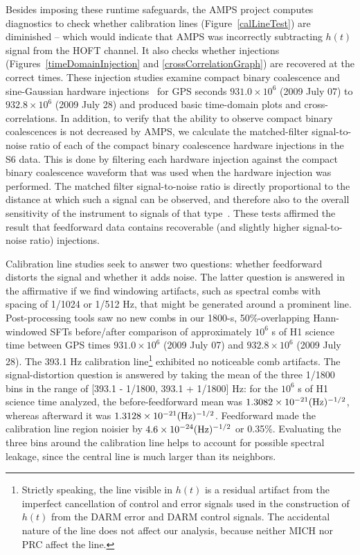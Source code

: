 Besides imposing these runtime safeguards, the AMPS project computes diagnostics to check whether calibration lines (Figure~\ref{calLineTest}) are diminished -- which would indicate that AMPS was incorrectly subtracting $h(t)$ signal from the HOFT channel. It also checks whether injections (Figures~\ref{timeDomainInjection} and \ref{crossCorrelationGraph}) are recovered at the correct times. These injection studies examine compact binary coalescence and sine-Gaussian hardware injections~\cite{LIGOBurst2012} for GPS seconds $931.0 \times 10^6$ (2009 July 07) to $932.8 \times 10^6$ (2009 July 28) and produced basic time-domain plots and cross-correlations. In addition, to verify that the ability to observe compact binary coalescences is not decreased by AMPS, we calculate the matched-filter signal-to-noise ratio of each of the compact binary coalescence hardware injections in the S6 data. This is done by filtering each hardware injection against the compact binary coalescence waveform that was used when the hardware injection was performed. The matched filter signal-to-noise ratio is directly proportional to the distance at which such a signal can be observed, and therefore also to the overall sensitivity of the instrument to signals of that type~\cite{Findchirp2012,PetersMatthews1963}. These tests affirmed the result that feedforward data contains recoverable (and slightly higher signal-to-noise ratio) injections.

Calibration line studies seek to answer two questions: whether feedforward distorts the signal and whether it adds noise. The latter question is answered in the affirmative if we find windowing artifacts, such as spectral combs with spacing of 1/1024 or 1/512 Hz, that might be generated around a prominent line. Post-processing tools saw no new combs in our 1800-s, 50\%-overlapping Hann-windowed SFTs before/after comparison of  approximately $10^6$ s of H1 science time between GPS times $931.0 \times 10^6$ (2009 July 07) and $932.8 \times 10^6$ (2009 July 28). The 393.1 Hz calibration line\footnote{Strictly speaking, the line visible in $h(t)$ is a residual artifact from the imperfect cancellation of control and error signals used in the construction of $h(t)$ from the DARM error and DARM control signals. The accidental nature of the line does not affect our analysis, because neither MICH nor PRC affect the line.} exhibited no noticeable comb artifacts. The signal-distortion question is answered by taking the mean of the three 1/1800 bins in the range of [393.1 - 1/1800, 393.1 + 1/1800] Hz: for the $10^6$ s of H1 science time analyzed, the before-feedforward mean was $1.3082 \times 10^{-21} (\textup{Hz})^{-1/2}$, whereas afterward it was $1.3128 \times 10^{-21} (\textup{Hz})^{-1/2}$. Feedforward made the calibration line region noisier by $4.6 \times 10^{-24} (\textup{Hz})^{-1/2}$ or 0.35\%. Evaluating the three bins around the calibration line helps to account for possible spectral leakage, since the central line is much larger than its neighbors. 

